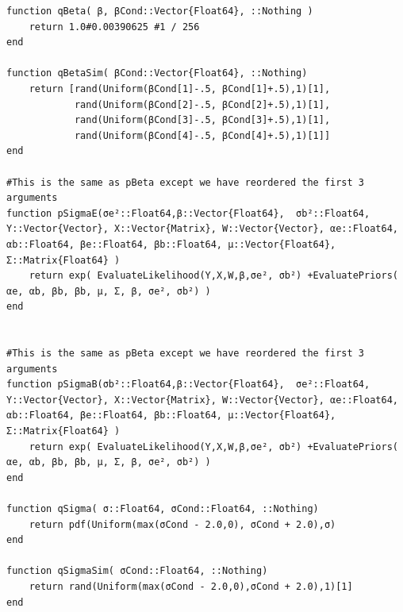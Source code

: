 \documentclass[12pt]{paper}
\begin{document}
\begin{verbatim}
function qBeta( β, βCond::Vector{Float64}, ::Nothing )
    return 1.0#0.00390625 #1 / 256
end

function qBetaSim( βCond::Vector{Float64}, ::Nothing)
    return [rand(Uniform(βCond[1]-.5, βCond[1]+.5),1)[1],
            rand(Uniform(βCond[2]-.5, βCond[2]+.5),1)[1],
            rand(Uniform(βCond[3]-.5, βCond[3]+.5),1)[1],
            rand(Uniform(βCond[4]-.5, βCond[4]+.5),1)[1]]
end

#This is the same as pBeta except we have reordered the first 3 arguments
function pSigmaE(σe²::Float64,β::Vector{Float64},  σb²::Float64, Y::Vector{Vector}, X::Vector{Matrix}, W::Vector{Vector}, αe::Float64, αb::Float64, βe::Float64, βb::Float64, μ::Vector{Float64}, Σ::Matrix{Float64} )
    return exp( EvaluateLikelihood(Y,X,W,β,σe², σb²) +EvaluatePriors( αe, αb, βb, βb, μ, Σ, β, σe², σb²) )
end


#This is the same as pBeta except we have reordered the first 3 arguments
function pSigmaB(σb²::Float64,β::Vector{Float64},  σe²::Float64, Y::Vector{Vector}, X::Vector{Matrix}, W::Vector{Vector}, αe::Float64, αb::Float64, βe::Float64, βb::Float64, μ::Vector{Float64}, Σ::Matrix{Float64} )
    return exp( EvaluateLikelihood(Y,X,W,β,σe², σb²) +EvaluatePriors( αe, αb, βb, βb, μ, Σ, β, σe², σb²) )
end

function qSigma( σ::Float64, σCond::Float64, ::Nothing)
    return pdf(Uniform(max(σCond - 2.0,0), σCond + 2.0),σ)
end

function qSigmaSim( σCond::Float64, ::Nothing)
    return rand(Uniform(max(σCond - 2.0,0),σCond + 2.0),1)[1]
end

\end{verbatim}
\end{document}
